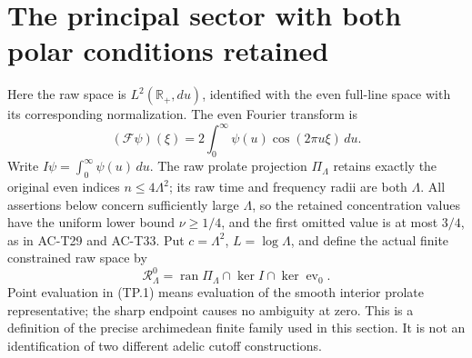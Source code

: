 \section{The principal sector with both polar conditions retained}

Here the raw space is \(L^2(\mathbb R_+,du)\), identified with
the even full-line space with its corresponding normalization.
The even Fourier transform is
\[
 (\mathcal F\psi)(\xi)=2\int_0^\infty
                       \psi(u)\cos(2\pi u\xi)\,du .
\]
Write \(I\psi=\int_0^\infty\psi(u)\,du\).
The raw prolate projection \(\Pi_\Lambda\) retains exactly the
original even indices \(n\leq4\Lambda^2\); its raw time and
frequency radii are both \(\Lambda\).
All assertions below concern sufficiently large \(\Lambda\),
so the retained concentration values have the uniform lower
bound \(\nu\geq1/4\), and the first omitted value is at most
\(3/4\), as in AC-T29 and AC-T33.
Put \(c=\Lambda^2\), \(L=\log\Lambda\), and define the actual
finite constrained raw space by
\[
 \mathcal R_\Lambda^0
   =\operatorname{ran}\Pi_\Lambda
                 \cap\ker I\cap\ker\operatorname{ev}_0 .
 \tag{TP.1}
\]
Point evaluation in (TP.1) means evaluation of the smooth
interior prolate representative; the sharp endpoint causes
no ambiguity at zero.  This is a definition of the precise
archimedean finite family used in this section.
It is not an identification of two different adelic cutoff
constructions.

